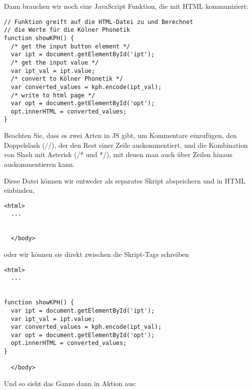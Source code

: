 Dann brauchen wir noch eine JavaScript Funktion, die mit HTML
kommuniziert:

\begin{verbatim}
// Funktion greift auf die HTML-Datei zu und Berechnet
// die Werte für die Kölner Phonetik
function showKPH() {
  /* get the input button element */
  var ipt = document.getElementById('ipt');
  /* get the input value */
  var ipt_val = ipt.value;
  /* convert to Kölner Phonetik */
  var converted_values = kph.encode(ipt_val);
  /* write to html page */
  var opt = document.getElementById('opt');
  opt.innerHTML = converted_values;
}
\end{verbatim}

{Beachten Sie, dass es zwei Arten in JS gibt, um Kommentare einzufügen,
den Doppelslash (//), der den Rest einer Zeile auskommentiert, und die
Kombination von Slash mit Asterisk (/* und */), mit denen man auch über
Zeilen hinaus auskommentieren kann. }



Diese Datei können wir entweder als separates Skript abspeichern und in
HTML einbinden,

\begin{verbatim}
<html>
  ...
    
    
  </body>
\end{verbatim}

oder wir können sie direkt zwischen die Skript-Tags schreiben

\begin{verbatim}
<html>
  ...
    
    
function showKPH() {
  var ipt = document.getElementById('ipt');
  var ipt_val = ipt.value;
  var converted_values = kph.encode(ipt_val);
  var opt = document.getElementById('opt');
  opt.innerHTML = converted_values;
}
    
  </body>
\end{verbatim}



Und so sieht das Ganze dann in Aktion aus:

